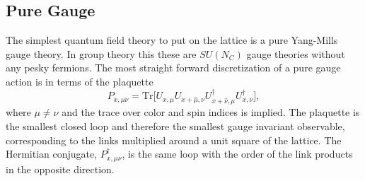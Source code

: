 
\subsection{Pure Gauge}
The simplest quantum field theory to put on the lattice is a pure Yang-Mills gauge theory.
In group theory this these are $SU(N_C)$ gauge theories without any pesky fermions.
The most straight forward discretization of a pure gauge action is in terms of the plaquette
\begin{equation}
  P_{x,\mu\nu}=\mbox{Tr}\Big[U_{x,\mu}U_{x+\hat{\mu},\nu}U^{\dagger}_{x+\hat{\nu},\mu}U^{\dagger}_{x,\nu}\Big],
\end{equation}
where $\mu\neq\nu$ and the trace over color and spin indices is implied.
The plaquette is the smallest closed loop and therefore the smallest gauge invariant observable, corresponding to the links multiplied around a unit square of the lattice.
The Hermitian conjugate, $P^{\dagger}_{x,\mu\nu}$, is the same loop with the order of the link products in the opposite direction.

